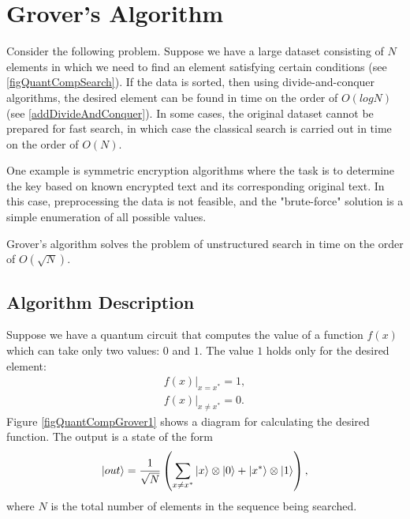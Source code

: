 \section{Grover's Algorithm}
Consider the following problem. Suppose we have a large dataset consisting of $N$ elements in which we need to find an element satisfying certain conditions (see \autoref{figQuantCompSearch}). If the data is sorted, then using divide-and-conquer algorithms, the desired element can be found in time on the order of $O\left(log N\right)$ (see \autoref{addDivideAndConquer}). In some cases, the original dataset cannot be prepared for fast search, in which case the classical search is carried out in time on the order of $O\left(N\right)$.



One example is symmetric encryption algorithms where the task is to determine the key based on known encrypted text and its corresponding original text. In this case, preprocessing the data is not feasible, and the "brute-force" solution is a simple enumeration of all possible values.

Grover's algorithm \cite{Grover96afast} solves the problem of unstructured search in time on the order of $O\left(\sqrt{N}\right)$.

\subsection{Algorithm Description}

Suppose we have a quantum circuit that computes the value of a function $f\left(x\right)$ which can take only two values: $0$ and $1$. The value $1$ holds only for the desired element:
\begin{eqnarray}
\left.f\left(x\right)\right|_{x = x^{\ast}} = 1,
\nonumber \\
\left.f\left(x\right)\right|_{x \ne x^{\ast}} = 0.
\label{eqQuantCompGroverF}
\end{eqnarray}
Figure \autoref{figQuantCompGrover1} shows a diagram for calculating the desired function. The output is a state of the form
\begin{equation}
\ket{out} = \frac{1}{\sqrt{N}}\left(
 \sum_{x \ne x^{\ast}} \ket{x}\otimes\ket{0}
+ \left|x^{\ast}\right>\otimes\ket{1}
\right),
\label{eqQuantCompGroverFake}
\end{equation}
where $N$ is the total number of elements in the sequence being searched.



